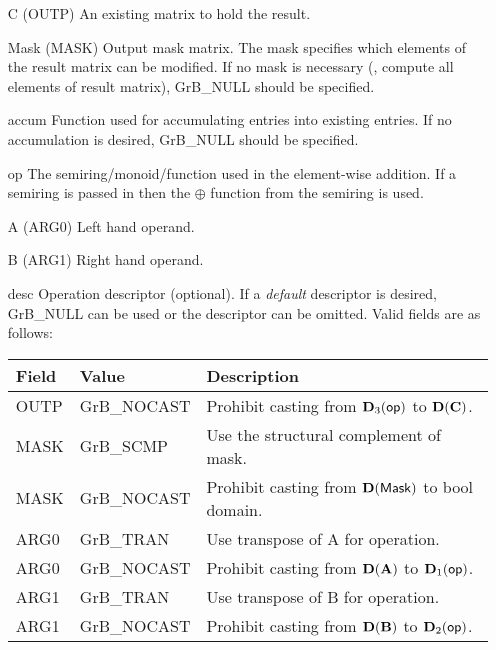 \begin{itemize}[leftmargin=1.1in]
    \item[{\sf C}]     ({\sf OUTP}) An existing matrix to hold the result.

    \item[{\sf Mask}] ({\sf MASK}) Output mask matrix. The mask
    specifies which elements of the result matrix can be modified.
    If no mask is necessary (\ie, compute all elements of result
    matrix), {\sf GrB\_NULL} should be specified.

    \item[{\sf accum}]  Function used for accumulating entries into existing
                         entries. If no accumulation is desired,
                        {\sf GrB\_NULL} should be specified.

    \item[{\sf op}]    The semiring/monoid/function used in the element-wise addition.
                       If a semiring is passed in then the $\oplus$ function from
                                    the semiring is used.
    \item[{\sf A}]     ({\sf ARG0}) Left hand operand.
    \item[{\sf B}]     ({\sf ARG1}) Right hand operand.
    
    \item[{\sf desc}]  Operation descriptor (optional). If a
    \emph{default} descriptor is desired, {\sf GrB\_NULL} can be
    used or the descriptor can be omitted. Valid fields are as follows: \\
    \begin{tabular}{lll}
        Field  & Value & Description \\
        \hline
        {\sf OUTP} & {\sf GrB\_NOCAST} & Prohibit casting from $\bold{D}_3({\sf op})$ to $\bold{D}({\bf C})$. \\
        {\sf MASK} & {\sf GrB\_SCMP} & Use the structural complement of {\sf mask}. \\
    {\sf MASK} & {\sf GrB\_NOCAST} & Prohibit casting from $\bold{D}({\sf Mask})$ to {\sf bool} domain. \\
    {\sf ARG0} & {\sf GrB\_TRAN} & Use transpose of {\sf A} for operation. \\
        {\sf ARG0} & {\sf GrB\_NOCAST} & Prohibit casting from $\bold{D}({\bf A})$ to $\bold{D}_1({\sf op})$. \\
    {\sf ARG1} & {\sf GrB\_TRAN} & Use transpose of {\sf B} for operation. \\
        {\sf ARG1} & {\sf GrB\_NOCAST} & Prohibit casting from $\bold{D}({\bf B})$ to $\bold{D}_2({\sf op})$. \\
    \end{tabular}
\end{itemize}

